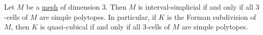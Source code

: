 \begin{proposition}
  Let $M$ be a \hyperref[idec:mesh:definition]{mesh} of dimension $3$.
  Then $M$ is interval-simplicial if and only if all $3$-cells of $M$
  are simple polytopes.
  In particular, if $K$ is the Forman subdivision of $M$,
  then $K$ is quasi-cubical if and only if all $3$-cells of $M$
  are simple polytopes.
\end{proposition}

